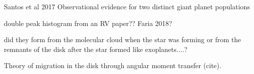 \citep{santos_observational_2017} Santos et al 2017   Observational evidence for two distinct giant planet populations


double peak histogram from an {RV} paper?? Faria 2018?


did they form from the molecular cloud when the star was forming or from the remnants of the disk after the star formed like exoplanets....?


Theory of migration in the disk through  angular moment transfer (cite).

